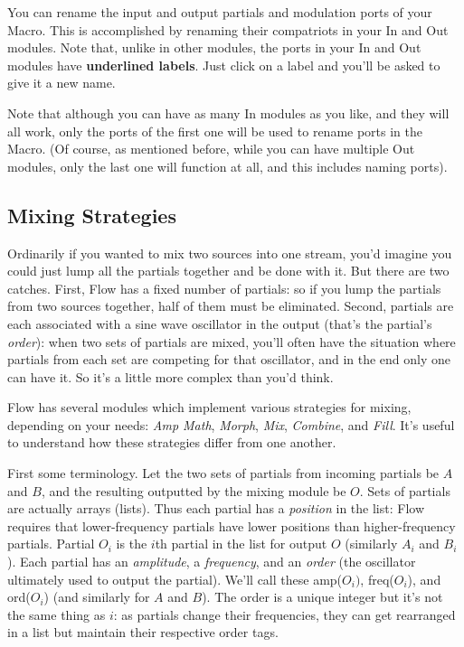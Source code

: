 \documentclass{article}
\newcommand\name{Flow}
\begin{document}
You can rename the input and output partials and modulation ports of your Macro.  This is accomplished by renaming their compatriots in your In and Out modules.  Note that, unlike in other modules, the ports in your In and Out modules have {\bf underlined labels}.  Just click on a label and you'll be asked to give it a new name.

Note that although you can have as many In modules as you like, and they will all work, only the ports of the first one will be used to rename ports in the Macro.  (Of course, as mentioned before, while you can have multiple Out modules, only the last one will function at all, and this includes naming ports).

\subsection{Mixing Strategies}

Ordinarily if you wanted to mix two sources into one stream, you'd imagine you could just lump all the partials together and be done with it.  But there are two catches.  First, {\name} has a fixed number of partials: so if you lump the partials from two sources together, half of them must be eliminated.  Second, partials are each associated with a sine wave oscillator in the output (that's the partial's {\it order}): when two sets of partials are mixed, you'll often have the situation where partials from each set are competing for that oscillator, and in the end only one can have it.  So it's a little more complex than you'd think.

{\name} has several modules which implement various strategies for mixing, depending on your needs: {\it Amp Math}, {\it Morph}, {\it Mix}, {\it Combine}, and {\it Fill}.  It's useful to understand how these strategies differ from one another.

First some terminology.  Let the two sets of partials from incoming partials be \(A\) and \(B\), and the resulting outputted by the mixing module be \(O\).   Sets of partials are actually arrays (lists).  Thus each partial has a {\it position} in the list: {\name} requires that lower-frequency partials have lower positions than higher-frequency partials.  Partial \(O_i\) is the \(i\)th partial in the list for output \(O\) (similarly \(A_i\) and \(B_i\)).  Each partial has an {\it amplitude}, a {\it frequency}, and an {\it order} (the oscillator ultimately used to output the partial).  We'll call these amp(\(O_i)\), freq(\(O_i\)), and ord(\(O_i\)) (and similarly for \(A\) and \(B\)).  The order is a unique integer but it's not the same thing as \(i\): as partials change their frequencies, they can get rearranged in a list but maintain their respective order tags.
\end{document}

